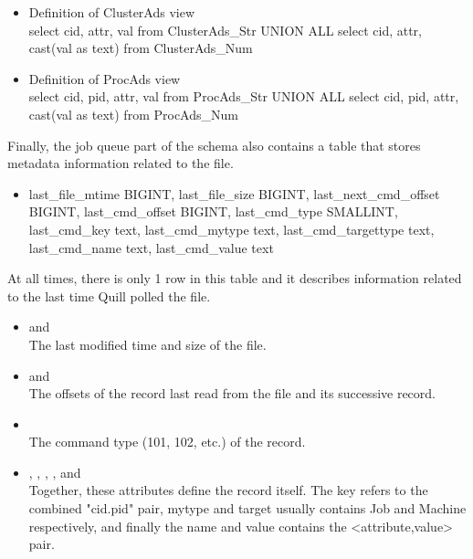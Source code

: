 \begin{itemize}
\item Definition of ClusterAds view\\
		{select cid, 
		attr, 
		val from ClusterAds\_Str UNION ALL
		select cid, 
		attr, 
		cast(val as text) from ClusterAds\_Num}


\item Definition of ProcAds view\\
		{select cid, 
		pid, 
		attr, 
		val from ProcAds\_Str UNION ALL
		select cid, 
		pid, 
		attr, 
		cast(val as text) from ProcAds\_Num}

\end{itemize}

Finally, the job queue part of the schema also contains a table that
stores metadata information related to the  file.

\begin{itemize}
\item {}
        {last\_file\_mtime         BIGINT,
        last\_file\_size          BIGINT,
        last\_next\_cmd\_offset    BIGINT,
        last\_cmd\_offset         BIGINT,
        last\_cmd\_type           SMALLINT,
        last\_cmd\_key            text,
        last\_cmd\_mytype         text,
        last\_cmd\_targettype     text,
        last\_cmd\_name           text,
        last\_cmd\_value          text}
\end{itemize}
	
At all times, there is only 1 row in this table and it describes
information related to the last time Quill polled the  file.

\begin{itemize}
\item {} and \\
	The last modified time and size of the file.

\item {} and \\
	The offsets of the record last read from the file and its successive record.

\item {}\\
	The command type (101, 102, etc.) of the record.

\item	{}, 
		, 
		,
		,
		and
		\\
	Together, these attributes define the record itself.	The key
	refers to the combined "cid.pid" pair, mytype and target usually
	contains Job and Machine respectively, and finally the name and
	value contains the <attribute,value> pair.
\end{itemize}

